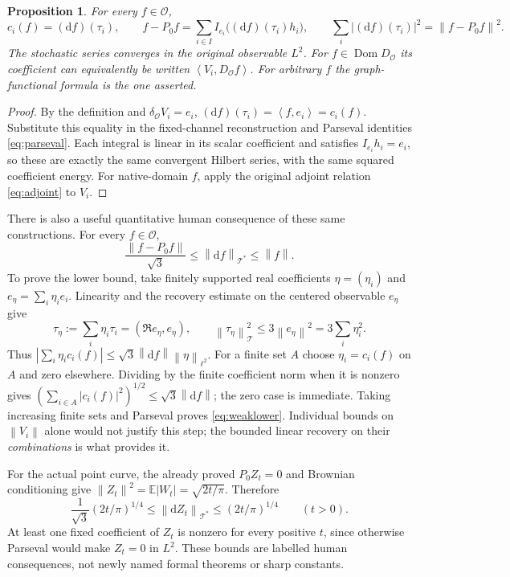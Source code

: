 \documentclass[11pt]{article}
\newtheorem{proposition}[theorem]{Proposition}
\theoremstyle{remark}\newtheorem{remark}[theorem]{Remark}
\newcommand{\E}{\mathbb E}
\newcommand{\norm}[1]{\left\lVert#1\right\rVert}
\newcommand{\inner}[2]{\left\langle#1,#2\right\rangle}
\newcommand{\OO}{\mathcal O}
\newcommand{\Dom}{\operatorname{Dom}}
\begin{document}
\begin{proposition}\label{prop:graphcoefficients}
For every $f\in\OO$,
\[
 c_i(f)=(\mathrm d f)(\tau_i),\qquad
 f-P_0f=\sum_{i\in I}I_{e_i}\bigl((\mathrm d f)(\tau_i)h_i\bigr),
 \qquad
 \sum_i |(\mathrm d f)(\tau_i)|^2=\norm{f-P_0f}^2.
\]
The stochastic series converges in the original observable $L^2$.
For $f\in\Dom D_{\OO}$ its coefficient can equivalently be written
$\inner{V_i}{D_{\OO}f}$. For arbitrary $f$ the graph-functional
formula is the one asserted.
\end{proposition}
\begin{proof}
By the definition and $\delta_{\OO}V_i=e_i$,
$(\mathrm d f)(\tau_i)=\inner f{e_i}=c_i(f)$.
Substitute this equality in the fixed-channel reconstruction and
Parseval identities \eqref{eq:parseval}. Each integral is linear
in its scalar coefficient and satisfies $I_{e_i}h_i=e_i$,
so these are exactly the same convergent Hilbert series, with the
same squared coefficient energy. For native-domain $f$, apply the
original adjoint relation \eqref{eq:adjoint} to $V_i$.
\end{proof}

There is also a useful quantitative human consequence of these same
constructions. For every $f\in\OO$,
\begin{equation}\label{eq:weaklower}
 \frac{\norm{f-P_0f}}{\sqrt3}
       \leq\norm{\mathrm d f}_{\mathcal T^*}\leq\norm f.
\end{equation}
To prove the lower bound, take finitely supported real coefficients
$\eta=(\eta_i)$ and $e_\eta=\sum_i\eta_ie_i$. Linearity and the
recovery estimate on the centered observable $e_\eta$ give
\[
 \tau_\eta:=\sum_i\eta_i\tau_i
       =(\mathfrak R e_\eta,e_\eta),\qquad
 \norm{\tau_\eta}_{\mathcal T}^2
       \leq3\norm{e_\eta}^2=3\sum_i\eta_i^2.
\]
Thus
$|\sum_i\eta_i c_i(f)|\leq\sqrt3\norm{\mathrm d f}\norm\eta_{\ell^2}$.
For a finite set $A$ choose $\eta_i=c_i(f)$ on $A$ and zero
elsewhere. Dividing by the finite coefficient norm when it is
nonzero gives
$(\sum_{i\in A}|c_i(f)|^2)^{1/2}\leq\sqrt3\norm{\mathrm d f}$;
the zero case is immediate. Taking increasing finite sets and
Parseval proves \eqref{eq:weaklower}. Individual bounds on
$\norm{V_i}$ alone would not justify this step; the bounded linear
recovery on their \emph{combinations} is what provides it.

For the actual point curve, the already proved $P_0Z_t=0$ and
Brownian conditioning give
$\norm{Z_t}^2=\E|W_t|=\sqrt{2t/\pi}$. Therefore
\[
 \frac1{\sqrt3}(2t/\pi)^{1/4}
 \leq\norm{\mathrm d Z_t}_{\mathcal T^*}
 \leq(2t/\pi)^{1/4}\qquad(t>0).
\]
At least one fixed coefficient of $Z_t$ is nonzero for every positive
$t$, since otherwise Parseval would make $Z_t=0$ in $L^2$.
These bounds are labelled human consequences, not newly named
formal theorems or sharp constants.
\end{document}
